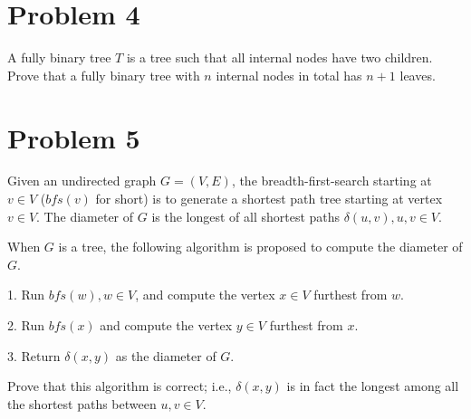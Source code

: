 \documentclass[11pt]{article}
\begin{document}
\section*{Problem 4}

A fully binary tree $T$ is a tree such that all internal nodes have
two children. Prove that a fully binary tree with $n$ internal nodes
in total has $n+1$ leaves.
\newline


\section*{Problem 5}

Given an undirected graph $G=(V,E)$, the breadth-first-search starting at $v\in V$
($bfs(v)$ for short) is to generate a shortest path tree starting at vertex
$v\in V$. The diameter of $G$ is the longest of all shortest paths $\delta(u,v), u,v\in V$.
\newline

When $G$ is a tree, the following algorithm is proposed to compute the
diameter of $G$.
\newline

1. Run $bfs(w), w\in V$, and compute the vertex $x\in V$ furthest from $w$.

2. Run $bfs(x)$ and compute the vertex $y\in V$ furthest from $x$.

3. Return $\delta(x,y)$ as the diameter of $G$.
\newline

Prove that this algorithm is correct; i.e., $\delta(x,y)$ is in fact the
longest among all the shortest paths between $u,v\in V$.
\newline

\end{document}
